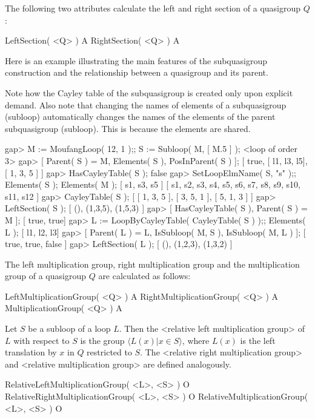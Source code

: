 The following two attributes calculate the left and right section of a
quasigroup $Q$:

\>LeftSection( <Q> ) A
\>RightSection( <Q> ) A

Here is an example illustrating the main features of the subquasigroup
construction and the relationship between a quasigroup and its parent.

Note how the Cayley table of the subquasigroup is created only upon explicit
demand. Also note that changing the names of elements of a subquasigroup
(subloop) automatically changes the names of the elements of the parent
subquasigroup (subloop). This is because the elements are shared.

\beginexample
gap> M := MoufangLoop( 12, 1 );; S := Subloop( M, [ M.5 ] );
<loop of order 3>
gap> [ Parent( S ) = M, Elements( S ), PosInParent( S ) ];
[ true, [ l1, l3, l5], [ 1, 3, 5 ] ]
gap> HasCayleyTable( S );
false
gap> SetLoopElmName( S, "s" );; Elements( S ); Elements( M );
[ s1, s3, s5 ]
[ s1, s2, s3, s4, s5, s6, s7, s8, s9, s10, s11, s12 ]
gap> CayleyTable( S );
[ [ 1, 3, 5 ], [ 3, 5, 1 ], [ 5, 1, 3 ] ]
gap> LeftSection( S );
[ (), (1,3,5), (1,5,3) ]
gap> [ HasCayleyTable( S ), Parent( S ) = M ];
[ true, true]
gap> L := LoopByCayleyTable( CayleyTable( S ) );; Elements( L );
[ l1, l2, l3]
gap> [ Parent( L ) = L, IsSubloop( M, S ), IsSubloop( M, L ) ];
[ true, true, false ]
gap> LeftSection( L );
[ (), (1,2,3), (1,3,2) ]
\endexample


The left multiplication group, right multiplication group and the
multiplication group of a quasigroup $Q$ are calculated as follows:

\>LeftMultiplicationGroup( <Q> ) A
\>RightMultiplicationGroup( <Q> ) A
\>MultiplicationGroup( <Q> ) A

Let $S$ be a subloop of a loop $L$. Then the <relative left multiplication group>
%
%
 of $L$ with respect to $S$ is the group $\langle L(x)|x\in S\rangle$, where
$L(x)$ is the left translation by $x$ in $Q$ restricted to $S$. The
<relative right multiplication group>
%
%
 and <relative multiplication group>
%
%
 are defined analogously.

\>RelativeLeftMultiplicationGroup( <L>, <S> ) O
\>RelativeRightMultiplicationGroup( <L>, <S> ) O
\>RelativeMultiplicationGroup( <L>, <S> ) O

